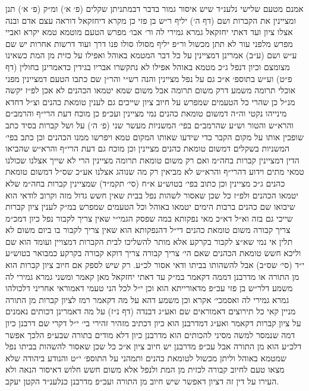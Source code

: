 \documentclass[12pt, openany]{book}
\begin{document}
\begin{multicols}{2}
אמנם מטעם שלישי נלענ״ד שיש איסור גמור בדבר דבמתניתן שקלים (פ׳ א׳) ומ״ק (פ׳ א׳) תנן ומציינין את הקברות ושם (דף ה׳) יליף ר״ש בן פזי כן מקרא דיחזקאל דוראה עצם אדם ובנה אצלו ציון ועד דאתי יחזקאל גמרא גמירי לה ור׳ אבו׳ מפרש הטעם מוטמא טמא יקרא ואביי מפרש מלפני עור לא תתן מכשול ור״פ יליף מסולו סולו פנו דרך ועוד דרשות אחרות יש שם ע״ש ושם (ע״ב) אמרינן דמציינין על כל דבר המטמא באוהל ואפילו על כזית מן המת כשאינו מצומצם וכיון דנפל ג״כ מטמא באוהל אפילו לא נתקשרו אבריו בגידין כדאמרינן בחולין (דף פ״ט) וע״ש בתוספ׳ א״כ גם על נפל מציינין והנה רש״י והר״ן שם כתבו הטעם דמציינין מפני אוכלי תרומה משמע דרק משום תרומה אבל משום שמא יטמאו הכהנים לא אכן לפ״ז יקשה מנ״ל כן שהרי כל הטעמים שמפרש על חיוב ציון שייכים גם לענין טומאת כהנים וצ״ל דחדא מינייהו נקטי וה״ה דמשום טומאת כהנים נמי מציינין ועכ״פ כן מוכח דעת הרי״ף והרמב״ם והרא״ש והטור וש״ע שהרמב״ם בפי׳ המשניות מעשר שני (פ׳ ה׳) על ושל קברות בסיד כתב שופכין אותו על מקום הקבר כדי שידעו שאותו המקום טמא ויפרשו ממנו הכהנים וכן כתב בפי׳ המשניות בשקלים דמשום טומאת כהנים מציינין וכן מוכח גם דעת הרי״ף והרא״ש שהביאו הדין דמציינין קברות בחה״מ ואם רק משום טומאת תרומה מציינין הרי לא שייך אצלנו שכולנו טמאי מתים וידוע דהרי״ף והרא״ש לא מביאין רק מה שנוהג אצלנו אע״כ שס״ל דמשום טומאת כהנים ג״כ מציינין וכן כתוב בפי׳ בטוש״ע א״ח (סי׳ תקמ״ד) שמציינין קברות בחה״מ שלא יטמאו הכהנים ולפ״ז כל שכן שאסור לשהות נפל בבית שאין חשש גדול מזה וקרוב לודאי הוא שיבואו שם כהנים ברבות הימים יטמאו באוהל וכל הטעמים שמפרש במ״ק לענין ציון קברות שייכי גם בזה וא״ל דא״כ מאי נפקותא במה שפסק הגמי״י שאין צריך לקבור נפל כיון דמכ״מ צריך קבורה משום טומאת כהנים די״ל דהנפקותא הוא שאין צריך לקבור בו ביום משום לא תלין אי נמי שא״צ לקבור בקרקע אלא מותר להשליכו לבית הקברות דמצויין ועומד הוא שם וליכא חשש טומאת הכהנים שאם הי׳ צריך קבורה צריך דוקא קבורה בקרקע כמבואר בטוש״ע י״ד (סי׳ שס״ב) אבל להשהותו בביתו ודאי אסור לכ״ע. רק שיש לספק אם חיוב ציון קברות הוא מן התורה או מדרבנן דממה דקאמר במ״ק עד דאתי יחזקאל מאן קאמר ומשני גמרא גמירי לה משמע דלר״ש בן פזי עכ״פ מדאורייתא הוא וכן י״ל לכל הני טעמי דאמוראי אחריני דלכולהו גמרא גמירי לה ואסמכי׳ אקרא וכן משמע דהא על מה דקאמר רמז לציון קברות מן התורה מניין קאי כל תירוצים דאמוראים שם ואע״ג דבנדה (דף נ״ז) על מה דאמרינן דכותים נאמנים על ציון קברות דקאמר ואע״ג דמדרבנן הוא כיון דכתיב מזהיר זהירי בי׳ י״ל דקרי שם דרבנן כיון דמה שנמסר למשה מסיני להכותים הוא מדרבנן כיון דלא מודים בתורה שבע״פ הלכך אפשר דלכ״ע הוא מן התורה אבל עכ״פ מדרבנן יש חיוב ציון א״כ כל שכן שאסור להשהות בביתו נפל שמטמא באוהל וליתן מכשול לטומאת כהנים ותמהני על התוספ׳ י״ט והנודע ביהודה שלא מצאו טעם לחיוב קבורה לכזית מן המת ולנפל אלא משום חשש חלוש דאיסור הנאה ולא העירו על דין זה דציון דאפשר שיש חיוב מן התורה ועכ״פ מדרבנן כנלענ״ד הקטן יעקב.\\\vspace{0pt}

\end{multicols}\newpage
\end{document}
